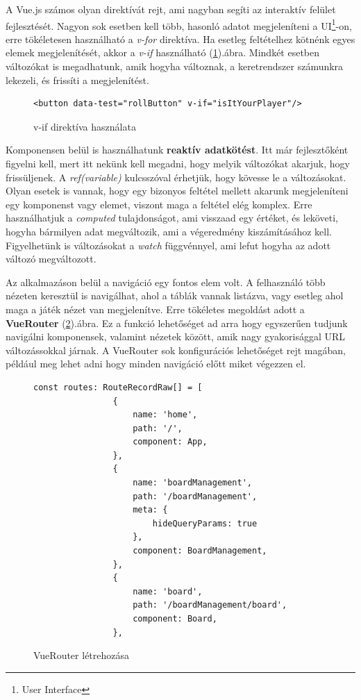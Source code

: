 \documentclass[a4paper,twoside]{article}
\begin{document}
A Vue.js számos olyan direktívát rejt, ami nagyban segíti az interaktív felület fejlesztését. Nagyon sok esetben kell több, hasonló adatot megjeleníteni a UI\footnote{User Interface}-on, erre tökéletesen használható a \textit{v-for} direktíva. Ha esetleg feltételhez kötnénk egyes elemek megjelenítését, akkor a \textit{v-if} használható (\ref{v-if}).ábra. Mindkét esetben változókat is megadhatunk, amik hogyha változnak, a keretrendszer számunkra lekezeli, és frissíti a megjelenítést.  

\begin{figure}
	\caption{v-if direktíva használata}
	
	\begin{minipage}{\textwidth}
		\begin{lstlisting}[style=javascriptStyle]
			<button data-test="rollButton" v-if="isItYourPlayer"/>
		\end{lstlisting}
	\end{minipage}
	
	\label{v-if}
\end{figure}

Komponensen belül is használhatunk \textbf{reaktív adatkötést}. Itt már fejlesztőként figyelni kell, mert itt nekünk kell megadni, hogy melyik változókat akarjuk, hogy frissüljenek. A \textit{ref(variable)} kulcsszóval érhetjük, hogy kövesse le a változásokat. Olyan esetek is vannak, hogy egy bizonyos feltétel mellett akarunk megjeleníteni egy komponenst vagy elemet, viszont maga a feltétel elég komplex. Erre használhatjuk a \textit{computed} tulajdonságot, ami visszaad egy értéket, és leköveti, hogyha bármilyen adat megváltozik, ami a végeredmény kiszámításához kell. Figyelhetünk is változásokat a \textit{watch} függvénnyel, ami lefut hogyha az adott változó megváltozott. 

Az alkalmazáson belül a navigáció egy fontos elem volt. A felhasználó több nézeten keresztül is navigálhat, ahol a táblák vannak listázva, vagy esetleg ahol maga a játék nézet van megjelenítve. Erre tökéletes megoldást adott a \textbf{VueRouter} (\ref{vuerouter}).ábra. Ez a funkció lehetőséget ad arra hogy egyszerűen tudjunk navigálni komponensek, valamint nézetek között, amik nagy gyakorisággal URL változássokkal járnak. A VueRouter sok konfigurációs lehetőséget rejt magában, például meg lehet adni hogy minden navigáció előtt miket végezzen el. 
\begin{figure}
	\caption{VueRouter létrehozása}
	
		\begin{minipage}{\textwidth}
			\begin{lstlisting}[style=javascriptStyle]
				const routes: RouteRecordRaw[] = [
				{
					name: 'home',
					path: '/',
					component: App,
				},
				{
					name: 'boardManagement',
					path: '/boardManagement',
					meta: {
						hideQueryParams: true
					},
					component: BoardManagement,
				},
				{
					name: 'board',
					path: '/boardManagement/board',
					component: Board,
				},
			\end{lstlisting}
		\end{minipage}
	
	\label{vuerouter}
\end{figure}
\end{document}
